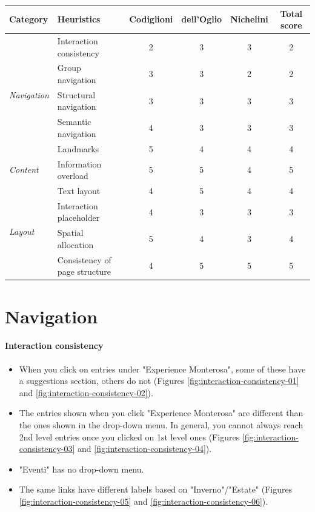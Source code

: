 \documentclass[a4paper, 11pt, parskip=half, headsepline]{scrreprt}
\begin{document}
\begin{center}
    \def\arraystretch{1.3}
    \begin{tabular}{|l|l|c|c|c|c|}
        \hline
        \textbf{Category} & \textbf{Heuristics} & \textbf{Codiglioni} & \textbf{dell'Oglio} & \textbf{Nichelini} & \textbf{Total score} \\ \hline
        \multirow{5}{*}{\textit{Navigation}} & Interaction consistency & 2 & 3 & 3 & 2 \\ \cline{2-6}
        & Group navigation & 3 & 3 & 2 & 2 \\ \cline{2-6}
        & Structural navigation & 3 & 3 & 3 & 3 \\ \cline{2-6}
        & Semantic navigation & 4 & 3 & 3 & 3 \\ \cline{2-6}
        & Landmarks & 5 & 4 & 4 & 4 \\ \hline
        \multirow{1}{*}{\textit{Content}} & Information overload & 5 & 5 & 4 & 5 \\ \hline
        \multirow{4}{*}{\textit{Layout}} & Text layout & 4 & 5 & 4 & 4 \\ \cline{2-6}
        & Interaction placeholder & 4 & 3 & 3 & 3 \\ \cline{2-6}
        & Spatial allocation & 5 & 4 & 3 & 4 \\ \cline{2-6}
        & Consistency of page structure & 4 & 5 & 5 & 5 \\ \hline
    \end{tabular}
\end{center}


\section{Navigation}

\paragraph{Interaction consistency}
\begin{itemize}
    \item When you click on entries under "Experience Monterosa", some of these have a suggestions section, others do not (Figures \ref{fig:interaction-consistency-01} and \ref{fig:interaction-consistency-02}).
    \item The entries shown when you click "Experience Monterosa" are different than the ones shown in the drop-down menu. In general, you cannot always reach 2nd level entries once you clicked on 1st level ones (Figures \ref{fig:interaction-consistency-03} and \ref{fig:interaction-consistency-04}).
    \item "Eventi" has no drop-down menu.
    \item The same links have different labels based on "Inverno"/"Estate" (Figures \ref{fig:interaction-consistency-05} and \ref{fig:interaction-consistency-06}).
\end{itemize}
\end{document}
